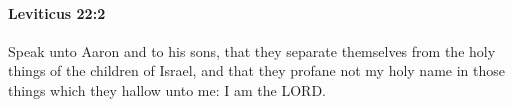 
		\paragraph{Leviticus 22:2} %
			\label{LEVITICUS-22-2}

			Speak unto Aaron and to his sons, that they separate themselves from the holy things of the children of Israel, and that they profane not my holy name in those things which they hallow unto me: I am the LORD.



